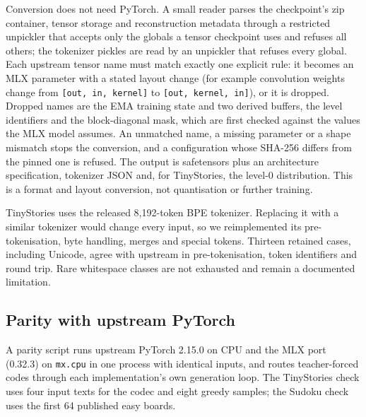 \documentclass[
  british,
]{article}
\begin{document}
Conversion does not need PyTorch. A small reader parses the checkpoint's
zip container, tensor storage and reconstruction metadata through a
restricted unpickler that accepts only the globals a tensor checkpoint
uses and refuses all others; the tokenizer pickles are read by an
unpickler that refuses every global. Each upstream tensor name must
match exactly one explicit rule: it becomes an MLX parameter with a
stated layout change (for example convolution weights change from
\texttt{{[}out,\ in,\ kernel{]}} to \texttt{{[}out,\ kernel,\ in{]}}),
or it is dropped. Dropped names are the EMA training state and two
derived buffers, the level identifiers and the block-diagonal mask,
which are first checked against the values the MLX model assumes. An
unmatched name, a missing parameter or a shape mismatch stops the
conversion, and a configuration whose SHA-256 differs from the pinned
one is refused. The output is safetensors plus an architecture
specification, tokenizer JSON and, for TinyStories, the level-0
distribution. This is a format and layout conversion, not quantisation
or further training.

TinyStories uses the released 8,192-token BPE tokenizer. Replacing it
with a similar tokenizer would change every input, so we reimplemented
its pre-tokenisation, byte handling, merges and special tokens. Thirteen
retained cases, including Unicode, agree with upstream in
pre-tokenisation, token identifiers and round trip. Rare whitespace
classes are not exhausted and remain a documented limitation.

\subsection{Parity with upstream
PyTorch}\label{parity-with-upstream-pytorch}

A parity script runs upstream PyTorch 2.15.0 on CPU and the MLX port
(0.32.3) on \texttt{mx.cpu} in one process with identical inputs, and
routes teacher-forced codes through each implementation's own generation
loop. The TinyStories check uses four input texts for the codec and
eight greedy samples; the Sudoku check uses the first 64 published easy
boards.
\end{document}
